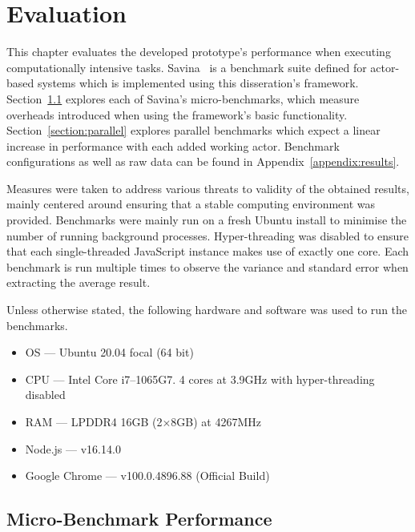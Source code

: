 \documentclass[oneside]{um-fict}
\begin{document}
\chapter{Evaluation}\label{chap:evaluation}
This chapter evaluates the developed prototype's performance when executing computationally intensive tasks. Savina~\cite{savina} is a benchmark suite defined for actor-based systems which is implemented using this disseration's framework. Section~\ref{section:microbenchmark} explores each of Savina's micro-benchmarks, which measure overheads introduced when using the framework's basic functionality. Section~\ref{section:parallel} explores parallel benchmarks which expect a linear increase in performance with each added working actor. Benchmark configurations as well as raw data can be found in Appendix~\ref{appendix:results}. 

Measures were taken to address various threats to validity of the obtained results, mainly centered around ensuring that a stable computing environment was provided. Benchmarks were mainly run on a fresh Ubuntu install to minimise the number of running background processes. Hyper-threading was disabled to ensure that each single-threaded JavaScript instance makes use of exactly one core. Each benchmark is run multiple times to observe the variance and standard error when extracting the average result.

Unless otherwise stated, the following hardware and software was used to run the benchmarks.
\begin{itemize}
    \item OS --- Ubuntu 20.04 focal (64 bit)
    \item CPU --- Intel Core i7--1065G7. 4 cores at 3.9GHz with hyper-threading disabled
    \item RAM --- LPDDR4 16GB (2$\times$8GB) at 4267MHz
    \item Node.js --- v16.14.0
    \item Google Chrome --- v100.0.4896.88 (Official Build)
\end{itemize}
\newpage
\section{Micro-Benchmark Performance}\label{section:microbenchmark}
\end{document}
